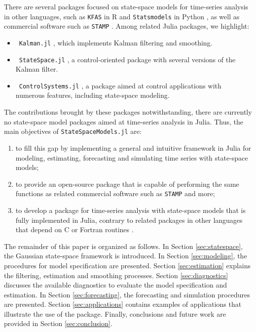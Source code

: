 \documentclass{juliacon}
\begin{document}
There are several packages focused on state-space models for time-series analysis in other languages, such as \texttt{KFAS} in R \cite{kfas} and \texttt{Statsmodels} in Python \cite{seabold2010statsmodels}, as well as commercial software such as \texttt{STAMP} \cite{koopman2000stamp}. Among related Julia packages, we highlight:
\begin{itemize}
    \item ~\texttt{Kalman.jl} \cite{kalmanjl}, which implements Kalman filtering and smoothing.
    \item ~\texttt{StateSpace.jl} \cite{statespacejl}, a control-oriented package with several versions of the Kalman filter.
    \item ~\texttt{ControlSystems.jl} \cite{controlsystemsjl}, a package aimed at control applications with numerous features, including state-space modeling.
\end{itemize}

The contributions brought by these packages notwithstanding, there are currently no state-space model packages aimed at time-series analysis in Julia. Thus, the main objectives of \texttt{StateSpaceModels.jl} \cite{statespacemodels} are:

\begin{enumerate}
    \item to fill this gap by implementing a general and intuitive framework in Julia for modeling, estimating, forecasting and simulating time series with state-space models;
    \item to provide an open-source package that is capable of performing the same functions as related commercial software such as \texttt{STAMP} and more;
    \item to develop a package for time-series analysis with state-space models that is fully implemented in Julia, contrary to related packages in other languages that depend on C or Fortran \mbox{routines} \cite{kfas}.
\end{enumerate}

The remainder of this paper is organized as follows. In Section \ref{sec:statespace}, the Gaussian state-space framework is introduced. In Section \ref{sec:modeling}, the procedures for model specification are presented. Section \ref{sec:estimation} explains the filtering, estimation and smoothing processes. Section \ref{sec:diagnostics} discusses the available diagnostics to evaluate the model specification and estimation. In Section \ref{sec:forecasting}, the forecasting and simulation procedures are presented. Section \ref{sec:applications} contains examples of applications that illustrate the use of the package. Finally, conclusions and future work are provided in Section \ref{sec:conclusion}.
\end{document}
